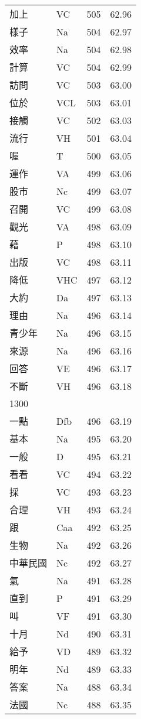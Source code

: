 \documentclass[twocolumn]{book}
\begin{document}
\begin{supertabular}{llrr}
加上 & VC & 505 &  62.96\\
樣子 & Na & 504 &  62.97\\
效率 & Na & 504 &  62.98\\
計算 & VC & 504 &  62.99\\
訪問 & VC & 503 &  63.00\\
位於 & VCL & 503 &  63.01\\
接觸 & VC & 502 &  63.03\\
流行 & VH & 501 &  63.04\\
喔 & T & 500 &  63.05\\
運作 & VA & 499 &  63.06\\
股市 & Nc & 499 &  63.07\\
召開 & VC & 499 &  63.08\\
觀光 & VA & 498 &  63.09\\
藉 & P & 498 &  63.10\\
出版 & VC & 498 &  63.11\\
降低 & VHC & 497 &  63.12\\
大約 & Da & 497 &  63.13\\
理由 & Na & 496 &  63.14\\
青少年 & Na & 496 &  63.15\\
來源 & Na & 496 &  63.16\\
回答 & VE & 496 &  63.17\\
不斷 & VH & 496 &  63.18\\
1300\\
一點 & Dfb & 496 &  63.19\\
基本 & Na & 495 &  63.20\\
一般 & D & 495 &  63.21\\
看看 & VC & 494 &  63.22\\
採 & VC & 493 &  63.23\\
合理 & VH & 493 &  63.24\\
跟 & Caa & 492 &  63.25\\
生物 & Na & 492 &  63.26\\
中華民國 & Nc & 492 &  63.27\\
氣 & Na & 491 &  63.28\\
直到 & P & 491 &  63.29\\
叫 & VF & 491 &  63.30\\
十月 & Nd & 490 &  63.31\\
給予 & VD & 489 &  63.32\\
明年 & Nd & 489 &  63.33\\
答案 & Na & 488 &  63.34\\
法國 & Nc & 488 &  63.35\\

\end{supertabular}
\end{document}
